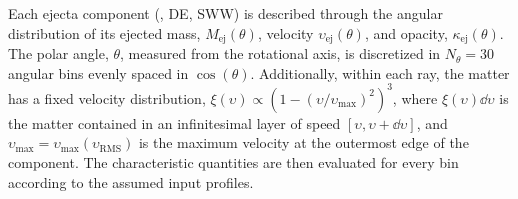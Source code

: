 Each ejecta component (\eg, \ac{DE}, \ac{SWW}) is described through 
the angular distribution of its ejected mass, $M_{\text{ej}}(\theta)$, 
velocity $\upsilon_{\text{ej}}(\theta)$, and opacity, $\kappa_{\text{ej}}(\theta)$.
%
The polar angle, $\theta$, measured from the rotational axis, is discretized in 
$N_\theta=30$ angular bins evenly spaced in $\cos{(\theta)}$.
%
Additionally, within each ray, the matter has a fixed velocity distribution, 
$\xi(\upsilon) \propto (1 - (\upsilon / \upsilon_{\text{max}})^2)^3$,
%
%
where $\xi(\upsilon) \dd \upsilon$ is the matter contained in an infinitesimal layer of speed 
$\left[\upsilon,\upsilon+\dd \upsilon\right]$, and 
$\upsilon_{\text{max}}=\upsilon_{\text{max}}(\upsilon_{\text{RMS}})$ 
is the maximum velocity at the outermost edge of the component.
%
The characteristic quantities are then evaluated for every bin according 
to the assumed input profiles. 


